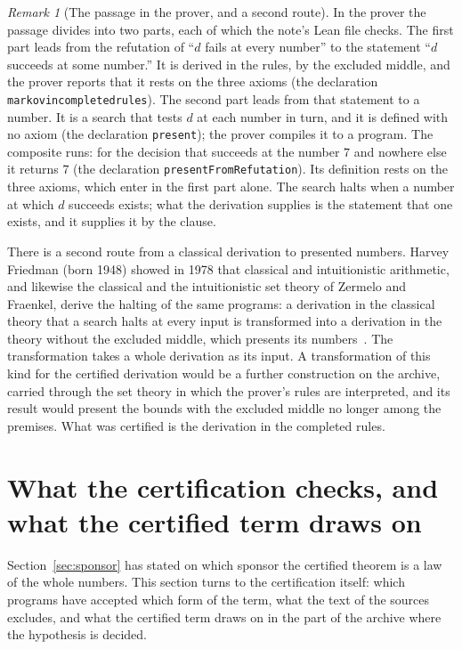 \documentclass[11pt]{article}
\theoremstyle{definition}
\theoremstyle{remark}
\newtheorem{remark}[theorem]{Remark}
\DeclareRobustCommand{\lean}[1]{{\renewcommand{\_}{\textunderscore\allowbreak}\texttt{#1}}}
\begin{document}
\begin{remark}[The passage in the prover, and a second route]\label{rem:routes}
In the prover the passage divides into two parts, each of which the note's Lean file checks. The first part leads from the refutation of ``$d$ fails at every number'' to the statement ``$d$ succeeds at some number.'' It is derived in the rules, by the excluded middle, and the prover reports that it rests on the three axioms (the declaration \lean{markov\_in\_completed\_rules}). The second part leads from that statement to a number. It is a search that tests $d$ at each number in turn, and it is defined with no axiom (the declaration \lean{present}); the prover compiles it to a program. The composite runs: for the decision that succeeds at the number $7$ and nowhere else it returns $7$ (the declaration \lean{presentFromRefutation}). Its definition rests on the three axioms, which enter in the first part alone. The search halts when a number at which $d$ succeeds exists; what the derivation supplies is the statement that one exists, and it supplies it by the clause.

There is a second route from a classical derivation to presented numbers. Harvey Friedman (born 1948) showed in 1978 that classical and intuitionistic arithmetic, and likewise the classical and the intuitionistic set theory of Zermelo and Fraenkel, derive the halting of the same programs: a derivation in the classical theory that a search halts at every input is transformed into a derivation in the theory without the excluded middle, which presents its numbers~\citep{friedman78}. The transformation takes a whole derivation as its input. A transformation of this kind for the certified derivation would be a further construction on the archive, carried through the set theory in which the prover's rules are interpreted, and its result would present the bounds with the excluded middle no longer among the premises. What was certified is the derivation in the completed rules.
\end{remark}

\section{What the certification checks, and what the certified term draws on}\label{sec:warrant}

Section~\ref{sec:sponsor} has stated on which sponsor the certified theorem is a law of the whole numbers. This section turns to the certification itself: which programs have accepted which form of the term, what the text of the sources excludes, and what the certified term draws on in the part of the archive where the hypothesis is decided.
\end{document}
